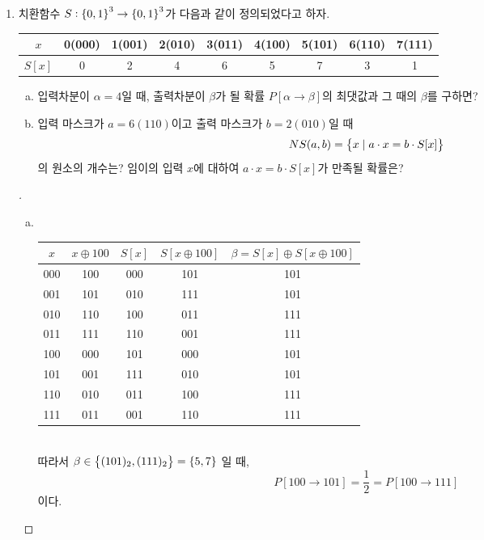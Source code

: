 \begin{enumerate}[\bf 1.]
	\item 치환함수 $S:\set{0,1}^3\to\set{0,1}^3$가 다음과 같이 정의되었다고 하자.
	\begin{table}[h!]\centering{}
		\begin{tabular}{|c||c|c|c|c|c|c|c|c|}
			\hline
			$x$ & 0(000) & 1(001) & 2(010) & 3(011) & 4(100) & 5(101) & 6(110) & 7(111) \\
			\hline
			$S[x]$ & 0 & 2 & 4 & 6 & 5 & 7 & 3 & 1 \\
			\hline
		\end{tabular}
	\end{table}
	\begin{enumerate}[(a)]
		\item 입력차분이 $\alpha=4$일 때, 출력차분이 $\beta$가 될 확률 $P[\alpha\to\beta]$의 최댓값과 그 때의 $\beta$를 구하면?
		\item 입력 마스크가 $a=6(110)$이고 출력 마스크가 $b=2(010)$일 때 \[
		NS(a,b)=\set{x\mid a\cdot x=b\cdot S[x]}
		\]의 원소의 개수는? 임이의 입력 $x$에 대하여 $a\cdot x=b\cdot S[x]$가 만족될 확률은?
	\end{enumerate}
	\begin{proof}[\sol]
		\ \begin{enumerate}[(a)]
			\item 
			\ \begin{table}[h!]\centering{}
				\begin{tabular}{cc|cc|c}
					\toprule[1.2pt]
					$x$ & $x\oplus 100$ & $S[x]$ & $S[x\oplus 100]$ & $\beta=S[x]\oplus S[x\oplus 100]$\\ \hline
					000 & 100 & 000 & 101 & 101 \\
					001 & 101 & 010 & 111 & 101 \\
					010 & 110 & 100 & 011 & 111 \\
					011 & 111 & 110 & 001 & 111 \\
					100 & 000 & 101 & 000 & 101 \\
					101 & 001 & 111 & 010 & 101 \\
					110 & 010 & 011 & 100 & 111 \\
					111 & 011 & 001 & 110 & 111 \\
					\bottomrule[1.2pt]
				\end{tabular}
			\end{table}\\ 따라서 $\beta\in\set{(101)_2, (111)_2}=\set{5,7}$ 일 때, $$
			P[100\to 101]=\frac{1}{2}=P[100\to 111]$$ 이다.

\end{enumerate}
\end{proof}
\end{enumerate}
